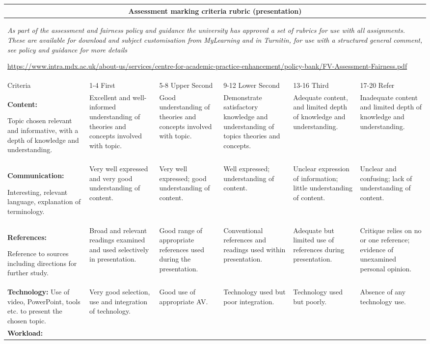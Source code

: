 \documentclass{MDXHandbook}
\begin{document}
\begin{landscape}
	\newpage
	\begin{tabular}{|p{.145\linewidth}|p{.145\linewidth}|p{.145\linewidth}|p{.145\linewidth}|p{.145\linewidth}|p{.145\linewidth}|}
		\hline
		\multicolumn{6}{|c|}{\textbf{Assessment marking criteria rubric (presentation)}} \\
		\hline
		\multicolumn{6}{|p{.87\linewidth}|}{
			\emph{As part of the assessment and fairness policy and guidance the university has approved a set of rubrics for use with all assignments. These are available for download and subject customisation from MyLearning and in Turnitin, for use with a structured general comment, see policy and guidance for more details}

			\url{https://www.intra.mdx.ac.uk/about-us/services/centre-for-academic-practice-enhancement/policy-bank/FV-Assessment-Fairness.pdf}
		}\\\hline

		Criteria &	1-4 First & 5-8 Upper Second & 9-12 Lower Second & 13-16 Third & 17-20 Refer \\\hline
		\textbf{Content:}
		
		Topic chosen relevant and informative, with a depth of knowledge and understanding.	
		
		& Excellent and well-informed understanding of theories and concepts involved with topic.
		& Good understanding of theories and concepts involved with topic.
		& Demonstrate satisfactory knowledge and understanding of topics theories and concepts.
		& Adequate content, and limited depth of knowledge and understanding.
		& Inadequate content and limited depth of knowledge and understanding.\\\hline

		\textbf{Communication:}
		
		Interesting, relevant language, explanation of terminology.
		
		& Very well expressed and very good understanding of content.
		& Very well expressed; good understanding of content.
		& Well expressed; understanding of content.
		& Unclear expression of information; little understanding of content.
		& Unclear and confusing; lack of understanding of content.
		\\\hline
		\textbf{References:}
		
		Reference to sources including directions for further study.
		& Broad and relevant readings examined and used selectively in presentation.
		& Good range of appropriate references used during the presentation.
		& Conventional references and readings used within presentation.
		& Adequate but limited use of references during presentation.
		& Critique relies on no or one reference; evidence of unexamined personal opinion.
		\\\hline
		\textbf{Technology:}
		Use of video, PowerPoint, tools etc. to present the chosen topic.
		& Very good selection, use and integration of technology.
		& Good use of appropriate AV.
		& Technology used but poor integration.
		& Technology used but poorly.
		& Absence of any technology use.
		\\\hline
		\textbf{Workload:}
		

\end{tabular}
\end{landscape}
\end{document}
